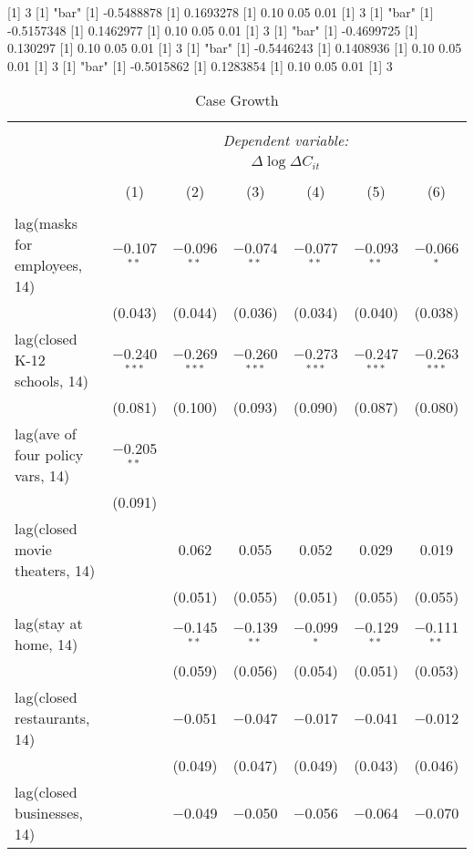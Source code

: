 [1] 3
[1] "bar"
[1] -0.5488878
[1] 0.1693278
[1] 0.10 0.05 0.01
[1] 3
[1] "bar"
[1] -0.5157348
[1] 0.1462977
[1] 0.10 0.05 0.01
[1] 3
[1] "bar"
[1] -0.4699725
[1] 0.130297
[1] 0.10 0.05 0.01
[1] 3
[1] "bar"
[1] -0.5446243
[1] 0.1408936
[1] 0.10 0.05 0.01
[1] 3
[1] "bar"
[1] -0.5015862
[1] 0.1283854
[1] 0.10 0.05 0.01
[1] 3

\begin{table}[!htbp] \centering 
  \caption{Case Growth} 
  \label{} 
\begin{tabular}{@{\extracolsep{1pt}}lcccccc} 
\\[-1.8ex]\hline 
\hline \\[-1.8ex] 
 & \multicolumn{6}{c}{\textit{Dependent variable:}} \\ 
\cline{2-7} 
 & \multicolumn{6}{c}{$\Delta \log \Delta C_{it}$} \\ 
\\[-1.8ex] & (1) & (2) & (3) & (4) & (5) & (6)\\ 
\hline \\[-1.8ex] 
 lag(masks for employees, 14) & $-$0.107$^{**}$ & $-$0.096$^{**}$ & $-$0.074$^{**}$ & $-$0.077$^{**}$ & $-$0.093$^{**}$ & $-$0.066$^{*}$ \\ 
  & (0.043) & (0.044) & (0.036) & (0.034) & (0.040) & (0.038) \\ 
  lag(closed K-12 schools, 14) & $-$0.240$^{***}$ & $-$0.269$^{***}$ & $-$0.260$^{***}$ & $-$0.273$^{***}$ & $-$0.247$^{***}$ & $-$0.263$^{***}$ \\ 
  & (0.081) & (0.100) & (0.093) & (0.090) & (0.087) & (0.080) \\ 
  lag(ave of four policy vars, 14) & $-$0.205$^{**}$ &  &  &  &  &  \\ 
  & (0.091) &  &  &  &  &  \\ 
  lag(closed movie theaters, 14) &  & 0.062 & 0.055 & 0.052 & 0.029 & 0.019 \\ 
  &  & (0.051) & (0.055) & (0.051) & (0.055) & (0.055) \\ 
  lag(stay at home, 14) &  & $-$0.145$^{**}$ & $-$0.139$^{**}$ & $-$0.099$^{*}$ & $-$0.129$^{**}$ & $-$0.111$^{**}$ \\ 
  &  & (0.059) & (0.056) & (0.054) & (0.051) & (0.053) \\ 
  lag(closed restaurants, 14) &  & $-$0.051 & $-$0.047 & $-$0.017 & $-$0.041 & $-$0.012 \\ 
  &  & (0.049) & (0.047) & (0.049) & (0.043) & (0.046) \\ 
  lag(closed businesses, 14) &  & $-$0.049 & $-$0.050 & $-$0.056 & $-$0.064 & $-$0.070 \\ 

\end{tabular}
\end{table}
